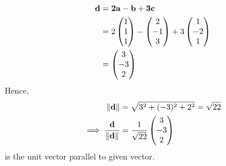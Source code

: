 \begin{align}
	\mathbf{d}&=\mathbf{2a}-\mathbf{b}+\mathbf{3c}\\
	       &= 2\begin{pmatrix}1\\1\\1\end{pmatrix}
-\begin{pmatrix}2\\-1\\3\end{pmatrix}+3\begin{pmatrix}1\\-2\\1\end{pmatrix}
\\
	       &=\begin{pmatrix}3\\-3\\2\end{pmatrix}
\end{align}
Hence, 
\begin{align}
	\left\lVert\mathbf{d}\right\rVert&=\sqrt{3^2+(-3)^2+2^2}=\sqrt{22}\\
	\implies     \frac{\mathbf{d}}{\left\lVert\mathbf{d}\right\rVert}&=\frac{1}{\sqrt{22}}\begin{pmatrix}3\\-3\\2\end{pmatrix}
\end{align}
 is the unit vector parallel to given vector.
